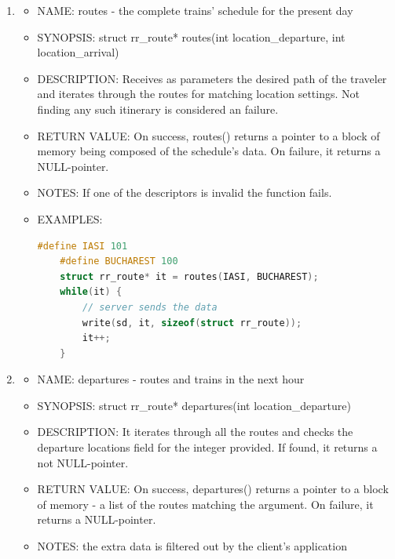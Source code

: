 \documentclass[runningheads]{llncs}
\begin{document}
\begin{enumerate}
   \item \begin{itemize} \item NAME: routes - the complete trains' schedule for the present day
            \item SYNOPSIS: struct rr\_route* routes(int location\_departure, int location\_arrival)  
            \item DESCRIPTION: Receives as parameters the desired path of the traveler and iterates through the routes for matching location settings. Not finding any such itinerary is considered an failure.
            \item RETURN VALUE: On success, routes() returns a pointer to a block of memory being composed of the schedule's data. On failure, it returns a NULL-pointer.
            \item NOTES: If one of the descriptors is invalid the function fails. 
            \item EXAMPLES: \begin{lstlisting}[language=C++]
    #define IASI 101
    #define BUCHAREST 100
    struct rr_route* it = routes(IASI, BUCHAREST);
    while(it) {
        // server sends the data 
        write(sd, it, sizeof(struct rr_route));
        it++; 
    }
            \end{lstlisting}
            \vspace{0.3cm}
   \end{itemize}
   
   \item \begin{itemize} \item NAME: departures - routes and trains in the next hour
            \item SYNOPSIS: struct rr\_route* departures(int location\_departure)  
            \item DESCRIPTION: It iterates through  all the routes and checks the departure locations field for the integer provided. If found, it returns a not NULL-pointer. 
            \item RETURN VALUE: On success, departures() returns a pointer to a block of memory - a list of the routes matching the argument. On failure, it returns a NULL-pointer.
            \item NOTES: the extra data is filtered out by the client's application
            \vspace{0.3cm}
   \end{itemize}
   

\end{enumerate}
\end{document}
